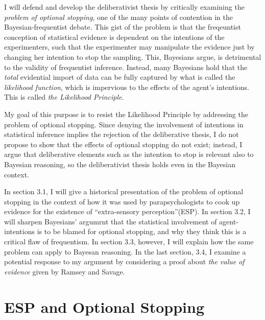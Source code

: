 I will defend and develop the deliberativist thesis by critically
examining the \emph{problem of optional stopping}, one of the many points of
contention in the Bayesian-frequentist debate. This gist of the problem
is that the freqeuntist conception of statistical evidence is dependent
on the intentions of the experimenters, such that the experimenter may
manipulate the evidence just by changing her intention to stop the
sampling. This, Bayesians argue, is detrimental to the validity of
frequentist inference. Instead, many Bayesians hold that the \emph{total} evidential
import of data can be fully captured by what is called the
\emph{likelihood function}, which is impervious to the effects of the
agent's intentions. This is called \emph{the Likelihood Principle}.

My goal of this purpose is to resist the Likelihood Principle by
addressing the problem of optional stopping. Since denying the involvement of intentions in statistical inference implies the rejection of the deliberative thesis, I do not propose to show that the effects of optional stopping do not exist; instead, I argue that deliberative elements such as the intention to stop is relevant also to Bayesian reasoning, so the deliberativist thesis holds even in the
Bayesian context.

In section 3.1, I will give a historical presentation of the problem of
optional stopping in the context of how it was used by
parapsychologists to cook up evidence for the existence of
``extra-sensory perception''(ESP). In section 3.2, I will sharpen
Bayesians' argumrnt that the statistical involvement of agent-intentions is to be blamed for optional stopping, and why
they think this is a critical flaw of frequentism. In section 3.3,
however, I will explain how the same problem can apply to Bayesan
reasoning. In the last section, 3.4, I examine a potential response to
my argument by considering a proof about \emph{the value of evidence}
given by Ramsey and Savage.

\hypertarget{esp-and-optional-stopping}{%
\section{ESP and Optional Stopping}\label{sec:esp-and-optional-stopping}}

